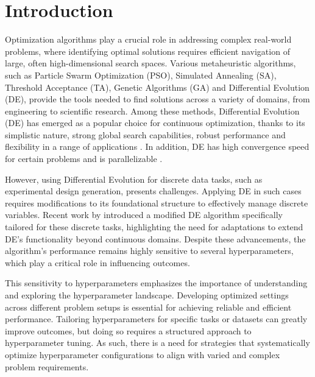 
\chapter{Introduction}

\noindent



Optimization algorithms play a crucial role in addressing complex real-world problems, where identifying optimal solutions requires efficient navigation of large, often high-dimensional search spaces. Various metaheuristic algorithms, such as Particle Swarm Optimization (PSO), Simulated Annealing (SA), Threshold Acceptance (TA), Genetic Algorithms (GA) and Differential Evolution (DE), provide the tools needed to find solutions across a variety of domains, from engineering to scientific research. Among these methods, Differential Evolution (DE) has emerged as a popular choice for continuous optimization, thanks to its simplistic nature, strong global search capabilities, robust performance and flexibility in a range of applications \parencite{storn1997differential}. In addition, DE has high convergence speed for certain problems \parencite{babu2003differential} and is parallelizable \parencite{kukkonen2006constrained}.

However, using Differential Evolution for discrete data tasks, such as experimental design generation, presents challenges. Applying DE in such cases requires modifications to its foundational structure to effectively manage discrete variables. Recent work by \textcite{stokes2023metaheuristic} introduced a modified DE algorithm specifically tailored for these discrete tasks, highlighting the need for adaptations to extend DE's functionality beyond continuous domains. Despite these advancements, the algorithm's performance remains highly sensitive to several hyperparameters, which play a critical role in influencing outcomes.

This sensitivity to hyperparameters emphasizes the importance of understanding and exploring the hyperparameter landscape. Developing optimized settings across different problem setups is essential for achieving reliable and efficient performance. Tailoring hyperparameters for specific tasks or datasets can greatly improve outcomes, but doing so requires a structured approach to hyperparameter tuning. As such, there is a need for strategies that systematically optimize hyperparameter configurations to align with varied and complex problem requirements. 

